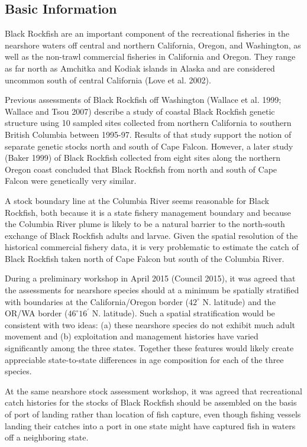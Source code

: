 \documentclass[11pt,
  english,
  letterpaper,
]{article}
\begin{document}
\hypertarget{basic-information}{%
\subsection{Basic Information}\label{basic-information}}

Black Rockfish are an important component of the recreational fisheries in the nearshore waters off central and northern California, Oregon, and Washington, as well as the non-trawl commercial fisheries in California and Oregon. They range as far north as Amchitka and Kodiak islands in Alaska and are considered uncommon south of central California (Love et al. 2002).

Previous assessments of Black Rockfish off Washington (Wallace et al. 1999; Wallace and Tsou 2007) describe a study of coastal Black Rockfish genetic structure using 10 sampled sites collected from northern California to southern British Columbia between 1995-97. Results of that study support the notion of separate genetic stocks north and south of Cape Falcon. However, a later study (Baker 1999) of Black Rockfish collected from eight sites along the northern Oregon coast concluded that Black Rockfish from north and south of Cape Falcon were genetically very similar.

A stock boundary line at the Columbia River seems reasonable for Black Rockfish, both because it is a state fishery management boundary and because the Columbia River plume is likely to be a natural barrier to the north-south exchange of Black Rockfish adults and larvae. Given the spatial resolution of the historical commercial fishery data, it is very problematic to estimate the catch of Black Rockfish taken north of Cape Falcon but south of the Columbia River.

During a preliminary workshop in April 2015 (Council 2015), it was agreed that the assessments for nearshore species should at a minimum be spatially stratified with boundaries at the California/Oregon border (\(42^\circ\) N. latitude) and the OR/WA border (\(46^\circ 16^\prime\) N. latitude). Such a spatial stratification would be consistent with two ideas: (a) these nearshore species do not exhibit much adult movement and (b) exploitation and management histories have varied significantly among the three states. Together these features would likely create appreciable state-to-state differences in age composition for each of the three species.

At the same nearshore stock assessment workshop, it was agreed that recreational catch histories for the stocks of Black Rockfish should be assembled on the basis of port of landing rather than location of fish capture, even though fishing vessels landing their catches into a port in one state might have captured fish in waters off a neighboring state.
\end{document}
